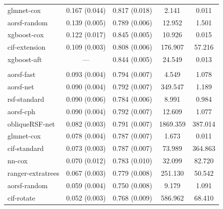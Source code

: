 \documentclass[twoside,11pt]{article}\usepackage[]{graphicx}\usepackage[]{xcolor}
\newenvironment{knitrout}{}{} %
\begin{document}
\begin{knitrout}
\begin{longtable}[t]{lcccc}
\hspace{1em}glmnet-cox & 0.167 (0.044) & 0.817 (0.018) & 2.141 & 0.011\\
\hspace{1em}aorsf-random & 0.139 (0.005) & 0.789 (0.006) & 12.952 & 1.501\\
\hspace{1em}xgboost-cox & 0.122 (0.017) & 0.845 (0.005) & 10.926 & 0.015\\
\hspace{1em}cif-extension & 0.109 (0.003) & 0.808 (0.006) & 176.907 & 57.216\\
\hspace{1em}xgboost-aft & --- & 0.844 (0.005) & 24.549 & 0.013\\
\addlinespace[0.3em]
\multicolumn{5}{l}{\textit{\textbf{ARIC; stroke, n = 13623, p = 41}}}\\
\hline
\hspace{1em}aorsf-fast & 0.093 (0.004) & 0.794 (0.007) & 4.549 & 1.078\\
\hspace{1em}aorsf-net & 0.090 (0.004) & 0.792 (0.007) & 349.547 & 1.189\\
\hspace{1em}rsf-standard & 0.090 (0.006) & 0.784 (0.006) & 8.991 & 0.984\\
\hspace{1em}aorsf-cph & 0.090 (0.004) & 0.792 (0.007) & 12.609 & 1.077\\
\hspace{1em}obliqueRSF-net & 0.082 (0.003) & 0.791 (0.007) & 1869.359 & 387.014\\
\hspace{1em}glmnet-cox & 0.078 (0.004) & 0.787 (0.007) & 1.673 & 0.011\\
\hspace{1em}cif-standard & 0.073 (0.003) & 0.787 (0.007) & 73.989 & 364.863\\
\hspace{1em}nn-cox & 0.070 (0.012) & 0.783 (0.010) & 32.099 & 82.720\\
\hspace{1em}ranger-extratrees & 0.067 (0.003) & 0.779 (0.008) & 251.130 & 50.542\\
\hspace{1em}aorsf-random & 0.059 (0.004) & 0.750 (0.008) & 9.179 & 1.091\\
\hspace{1em}cif-rotate & 0.052 (0.003) & 0.768 (0.009) & 586.962 & 68.410\\

\end{longtable}
\end{knitrout}
\end{document}
